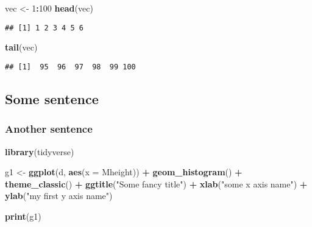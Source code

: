 \documentclass[]{article}
\newenvironment{Shaded}{\begin{snugshade}}{\end{snugshade}}
\newcommand{\DataTypeTok}[1]{\textcolor[rgb]{0.13,0.29,0.53}{#1}}
\newcommand{\DecValTok}[1]{\textcolor[rgb]{0.00,0.00,0.81}{#1}}
\newcommand{\KeywordTok}[1]{\textcolor[rgb]{0.13,0.29,0.53}{\textbf{#1}}}
\newcommand{\NormalTok}[1]{#1}
\newcommand{\OperatorTok}[1]{\textcolor[rgb]{0.81,0.36,0.00}{\textbf{#1}}}
\newcommand{\StringTok}[1]{\textcolor[rgb]{0.31,0.60,0.02}{#1}}
\begin{document}
\begin{Shaded}
\begin{Highlighting}[]
\NormalTok{vec <-}\StringTok{ }\DecValTok{1}\OperatorTok{:}\DecValTok{100}
\KeywordTok{head}\NormalTok{(vec)}
\end{Highlighting}
\end{Shaded}

\begin{verbatim}
## [1] 1 2 3 4 5 6
\end{verbatim}

\begin{Shaded}
\begin{Highlighting}[]
\KeywordTok{tail}\NormalTok{(vec)}
\end{Highlighting}
\end{Shaded}

\begin{verbatim}
## [1]  95  96  97  98  99 100
\end{verbatim}

\newpage

\hypertarget{some-sentence}{%
\subsection{Some sentence}\label{some-sentence}}

\hypertarget{another-sentence}{%
\subsubsection{Another sentence}\label{another-sentence}}

\begin{Shaded}
\begin{Highlighting}[]
\KeywordTok{library}\NormalTok{(tidyverse)}

\NormalTok{g1 <-}\StringTok{ }\KeywordTok{ggplot}\NormalTok{(d, }\KeywordTok{aes}\NormalTok{(}\DataTypeTok{x =}\NormalTok{ Mheight)) }\OperatorTok{+}\StringTok{ }
\StringTok{  }\KeywordTok{geom_histogram}\NormalTok{() }\OperatorTok{+}
\StringTok{  }\KeywordTok{theme_classic}\NormalTok{() }\OperatorTok{+}
\StringTok{  }\KeywordTok{ggtitle}\NormalTok{(}\StringTok{"Some fancy title"}\NormalTok{) }\OperatorTok{+}
\StringTok{  }\KeywordTok{xlab}\NormalTok{(}\StringTok{"some x axis name"}\NormalTok{) }\OperatorTok{+}
\StringTok{  }\KeywordTok{ylab}\NormalTok{(}\StringTok{"my first y axis name"}\NormalTok{)}

\KeywordTok{print}\NormalTok{(g1)}
\end{Highlighting}
\end{Shaded}
\end{document}
